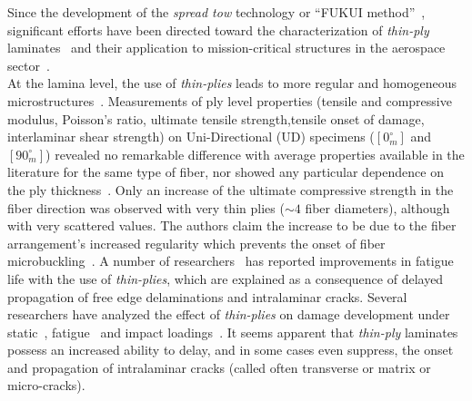 Since the development of the \emph{spread tow} technology or ``FUKUI method''~\cite{Kawabe2008}, significant efforts have been directed toward the characterization of \emph{thin-ply} laminates~\cite{Yamaguchi2005,Sihn2007,Yokozeki2008,Yokozeki2010,Saito2012,Arteiro2013,Arteiro2014,Amacher2014,Guillamet2014,Cugnoni2018} and their application to mission-critical structures in the aerospace sector~\cite{Kopp2017}.\\%
At the lamina level, the use of \emph{thin-plies} leads to more regular and homogeneous microstructures~\cite{Saito2012,Amacher2014}. Measurements of ply level properties (tensile and compressive modulus, Poisson's ratio, ultimate tensile strength,tensile onset of damage, interlaminar shear strength) on Uni-Directional (UD) specimens ($\left[0_{m}^{\circ}\right]$ and $\left[90_{m}^{\circ}\right]$) revealed no remarkable difference with average properties available in the literature for the same type of fiber, nor showed any particular dependence on the ply thickness~\cite{Amacher2014}. Only an increase of the ultimate compressive strength in the fiber direction was observed with very thin plies ($\sim4$ fiber diameters), although with very scattered values. The authors claim the increase to be due to the fiber arrangement's increased regularity which prevents the onset of fiber microbuckling~\cite{Amacher2014}. A number of researchers~\cite{Yamaguchi2005,Sihn2007,Yokozeki2008} has reported improvements in fatigue life with the use of \emph{thin-plies}, which are explained as a consequence of delayed propagation of free edge delaminations and intralaminar cracks. Several researchers have analyzed the effect of \emph{thin-plies} on damage development under static~\cite{Sihn2007,Yokozeki2008,Yokozeki2010,Saito2012,Arteiro2013,Arteiro2014,Amacher2014}, fatigue~\cite{Yamaguchi2005,Sihn2007,Yokozeki2008,Yokozeki2010,Amacher2014} and impact loadings~\cite{Sihn2007,Yokozeki2008,Yokozeki2010,Amacher2014}. It seems apparent that \emph{thin-ply} laminates possess an increased ability to delay, and in some cases even suppress, the onset and propagation of intralaminar cracks (called often transverse or matrix or micro-cracks).\\
